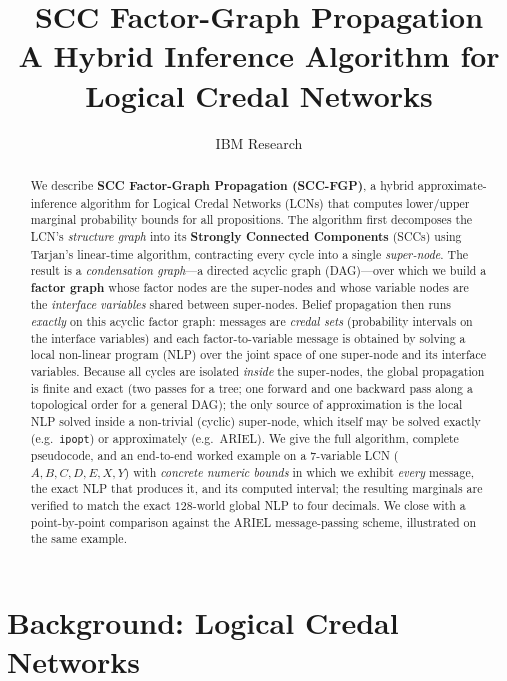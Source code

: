 \documentclass[11pt]{article}
\title{SCC Factor-Graph Propagation\\
       A Hybrid Inference Algorithm for Logical Credal Networks}
\author{IBM Research}
\date{}
\begin{document}
\maketitle

\begin{abstract}
We describe \textbf{SCC Factor-Graph Propagation (SCC-FGP)}, a hybrid
approximate-inference algorithm for Logical Credal Networks (LCNs) that
computes lower/upper marginal probability bounds for all propositions.
The algorithm first decomposes the LCN's \emph{structure graph} into its
\textbf{Strongly Connected Components} (SCCs) using Tarjan's linear-time
algorithm, contracting every cycle into a single \emph{super-node}. The
result is a \emph{condensation graph}---a directed acyclic graph (DAG)---over
which we build a \textbf{factor graph} whose factor nodes are the super-nodes
and whose variable nodes are the \emph{interface variables} shared between
super-nodes. Belief propagation then runs \emph{exactly} on this acyclic
factor graph: messages are \emph{credal sets} (probability intervals on the
interface variables) and each factor-to-variable message is obtained by
solving a local non-linear program (NLP) over the joint space of one
super-node and its interface variables. Because all cycles are isolated
\emph{inside} the super-nodes, the global propagation is finite and exact
(two passes for a tree; one forward and one backward pass along a topological
order for a general DAG); the only source of approximation is the local NLP
solved inside a non-trivial (cyclic) super-node, which itself may be solved
exactly (e.g.\ \texttt{ipopt}) or approximately (e.g.\ ARIEL). We give the
full algorithm, complete pseudocode, and an end-to-end worked example on a
$7$-variable LCN ($A,B,C,D,E,X,Y$) with \emph{concrete numeric bounds} in which
we exhibit \emph{every} message, the exact NLP that produces it, and its
computed interval; the resulting marginals are verified to match the exact
$128$-world global NLP to four decimals. We close with a point-by-point
comparison against the ARIEL message-passing scheme, illustrated on the same
example.
\end{abstract}

\tableofcontents

\section{Background: Logical Credal Networks}\label{sec:bg}
\end{document}
